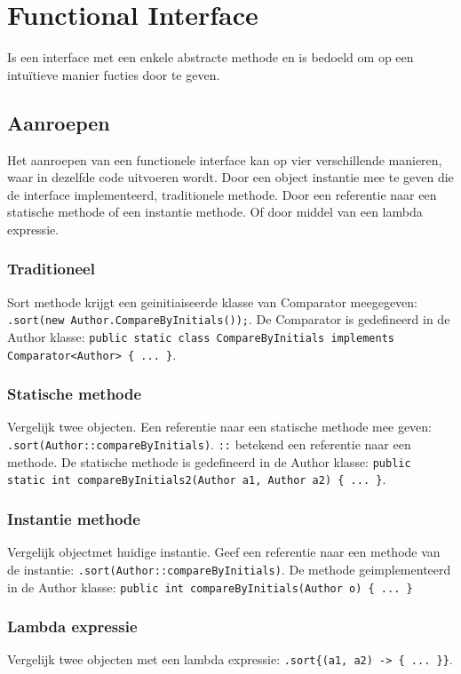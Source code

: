 \section{Functional Interface}
Is een interface met een enkele abstracte methode en is bedoeld om op een intuïtieve manier fucties door te geven.

\subsection{Aanroepen}
Het aanroepen van een functionele interface kan op vier verschillende manieren, waar in dezelfde code uitvoeren wordt.
Door een object instantie mee te geven die de interface implementeerd, traditionele methode.
Door een referentie naar een statische methode of een instantie methode.
Of door middel van een lambda expressie.

\subsubsection{Traditioneel}
Sort methode krijgt een geinitiaiseerde klasse van Comparator meegegeven: \texttt{.sort(new Author.CompareByInitials());}.
De Comparator is gedefineerd in de Author klasse: \texttt{public static class CompareByInitials implements Comparator<Author> \{ ... \}}.

\subsubsection{Statische methode}
Vergelijk twee objecten.
Een referentie naar een statische methode mee geven: \texttt{.sort(Author::compareByInitials)}.
\texttt{::} betekend een referentie naar een methode.
De statische methode is gedefineerd in de Author klasse: \texttt{public static int compareByInitials2(Author a1, Author a2) \{ ... \}}.

\subsubsection{Instantie methode}
Vergelijk objectmet huidige instantie.
Geef een referentie naar een methode van de instantie: \texttt{.sort(Author::compareByInitials)}.
De methode geimplementeerd in de Author klasse: \texttt{public int compareByInitials(Author o) \{ ... \}}

\subsubsection{Lambda expressie}
Vergelijk twee objecten met een lambda expressie: \texttt{.sort\{(a1, a2) -> \{ ... \}\}}.

